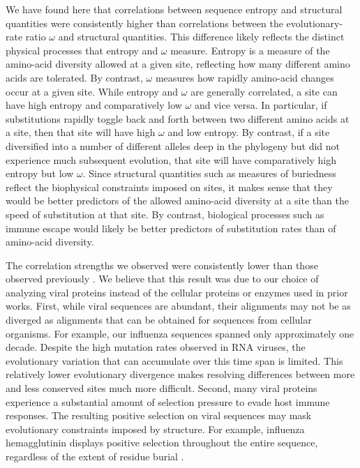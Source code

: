\documentclass[smallextended]{svjour3}
\begin{document}
We have found here that correlations between sequence entropy and structural quantities were consistently higher than correlations between the evolutionary-rate ratio $\omega$ and structural quantities. This difference likely reflects the distinct physical processes that entropy and $\omega$ measure. Entropy is a measure of the amino-acid diversity allowed at a given site, reflecting how many different amino acids are tolerated. By contrast, $\omega$ measures how rapidly amino-acid changes occur at a given site. While entropy and $\omega$ are generally correlated, a site can have high entropy and comparatively low $\omega$ and vice versa. In particular, if substitutions rapidly toggle back and forth between two different amino acids at a site, then that site will have high $\omega$ and low entropy. By contrast, if a site diversified into a number of different alleles deep in the phylogeny but did not experience much subsequent evolution, that site will have comparatively high entropy but low $\omega$. Since structural quantities such as measures of buriedness reflect the biophysical constraints imposed on sites, it makes sense that they would be better predictors of the allowed amino-acid diversity at a site than the speed of substitution at that site. By contrast, biological processes such as immune escape would likely be better predictors of substitution rates than of amino-acid diversity.

The correlation strengths we observed were consistently lower than those observed previously \citep{Jacksonetal2013,Yehetal2014}. We believe that this result was due to our choice of analyzing viral proteins instead of the cellular proteins or enzymes used in prior works. First, while viral sequences are abundant, their alignments may not be as diverged as alignments that can be obtained for sequences from cellular organisms. For example, our influenza sequences spanned only approximately one decade. Despite the high mutation rates observed in RNA viruses, the evolutionary variation that can accumulate over this time span is limited. This relatively lower evolutionary divergence makes resolving differences between more and less conserved sites much more difficult. Second, many viral proteins experience a substantial amount of selection pressure to evade host immune responses. The resulting positive selection on viral sequences may mask evolutionary constraints imposed by structure. For example, influenza hemagglutinin displays positive selection throughout the entire sequence, regardless of the extent of residue burial \citep{MeyerWilke2013,Meyeretal2013,Suzuki2006,Bushetal1999}.
\end{document}
